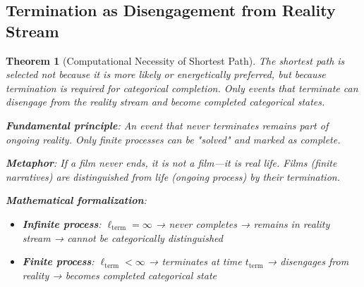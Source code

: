 \documentclass[12pt,a4paper]{article}
\newtheorem{theorem}{Theorem}[section]
\theoremstyle{remark}
\begin{document}
\subsection{Termination as Disengagement from Reality Stream}

\begin{theorem}[Computational Necessity of Shortest Path]
\label{thm:termination_necessity}
The shortest path is selected not because it is more likely or energetically preferred, but because \textit{termination is required for categorical completion}. Only events that terminate can disengage from the reality stream and become completed categorical states.

\textbf{Fundamental principle}: An event that never terminates remains part of ongoing reality. Only finite processes can be "solved" and marked as complete.

\textbf{Metaphor}: If a film never ends, it is not a film—it is real life. Films (finite narratives) are distinguished from life (ongoing process) by their termination.

\textbf{Mathematical formalization}:
\begin{itemize}
\item \textbf{Infinite process}: $\ell_{\text{term}} = \infty$ → never completes → remains in reality stream → cannot be categorically distinguished
\item \textbf{Finite process}: $\ell_{\text{term}} < \infty$ → terminates at time $t_{\text{term}}$ → disengages from reality → becomes completed categorical state
\end{itemize}
\end{theorem}
\end{document}
